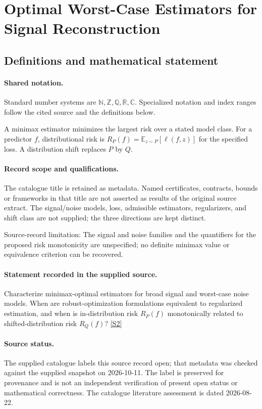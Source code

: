 \documentclass[11pt]{article}
\newcommand{\sref}[2]{\hyperlink{source:#1:#2}{[S#2]}}
\begin{document}
\section{Optimal Worst-Case Estimators for Signal Reconstruction}\label{statement}

\subsection{Definitions and mathematical statement}

\paragraph{Shared notation.}Standard number systems are $\mathbb N,\mathbb Z,\mathbb Q,\mathbb R,\mathbb C$. Specialized notation and index ranges follow the cited source and the definitions below.


A minimax estimator minimizes the largest risk over a stated model class. For a predictor $f$, distributional risk is $R_P(f)=\mathbb E_{z\sim P}[\ell(f,z)]$ for the specified loss. A distribution shift replaces $P$ by $Q$.
\paragraph{Record scope and qualifications.}
The catalogue title is retained as metadata. Named certificates, contracts, bounds or frameworks in that title are not asserted as results of the original source extract.
The signal/noise models, loss, admissible estimators, regularizers, and shift class are not supplied; the three directions are kept distinct.

Source-record limitation: The signal and noise families and the quantifiers for the proposed risk monotonicity are unspecified; no definite minimax value or equivalence criterion can be recovered.
\paragraph{Statement recorded in the supplied source.}
Characterize minimax-optimal estimators for broad signal and worst-case noise models. When are robust-optimization formulations equivalent to regularized estimation, and when is in-distribution risk $R_P(f)$ monotonically related to shifted-distribution risk $R_Q(f)$? \sref{statement}{2}
\paragraph{Source status.}
The supplied catalogue labels this source record open; that metadata was checked against the supplied snapshot on 2026-10-11. The label is preserved for provenance and is not an independent verification of present open status or mathematical correctness. The catalogue literature assessment is dated 2026-08-22.
\end{document}
